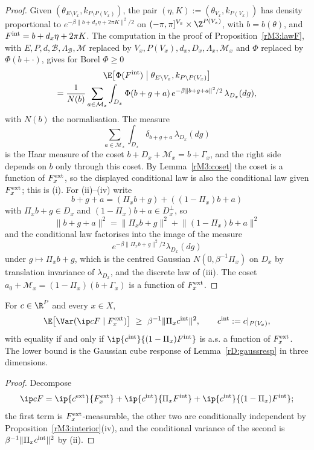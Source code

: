 \begin{proof}
Given $(\theta_{E\setminus V_x},k_{P\setminus P(V_x)})$, the pair
$(\eta,K):=(\theta_{V_x},k_{P(V_x)})$ has density proportional to
$e^{-\beta\lVert b+d_x\eta+2\pi K\rVert^2/2}$ on $(-\pi,\pi]^{V_x}\times
\Z^{P(V_x)}$, with $b=b(\theta)$, and $F^{\rm int}=b+d_x\eta+2\pi K$. The
computation in the proof of Proposition~\ref{rM3:lawF}, with $E,P,d,
\mathcal B,\Lambda_{\mathcal B},\mathcal M$ replaced by $V_x,P(V_x),d_x,
D_x,\Lambda_x,\mathcal M_x$ and $\Phi$ replaced by $\Phi(b+\cdot)$, gives
for Borel $\Phi\ge0$
\begin{multline*}
\E\bigl[\Phi(F^{\rm int})\bigm|\theta_{E\setminus V_x},k_{P\setminus P(V_x)}
\bigr]\\
=\frac1{N(b)}\sum_{a\in\mathcal M_x}\int_{D_x}\Phi(b+g+a)\,
e^{-\beta\lVert b+g+a\rVert^2/2}\,\lambda_{D_x}(dg),
\end{multline*}
with $N(b)$ the normalisation. The measure
\[
\sum_{a\in\mathcal M_x}\int_{D_x}\delta_{b+g+a}\,\lambda_{D_x}(dg)
\]
is the Haar measure of the coset
$b+D_x+\mathcal M_x=b+\Gamma_x$, and the right side depends on $b$ only
through this coset. By Lemma~\ref{rM3:coset} the coset is a function of
$F^{\rm ext}_x$, so the displayed conditional law is also the conditional
law given $F^{\rm ext}_x$; this is (i). For (ii)--(iv) write
\[
b+g+a=(\Pi_xb+g)+((1-\Pi_x)b+a)
\]
with $\Pi_xb+g\in D_x$ and $(1-\Pi_x)b+a\in
D_x^\perp$, so
\[
\lVert b+g+a\rVert^2=\lVert\Pi_xb+g\rVert^2+\lVert(1-\Pi_x)b+a\rVert^2
\]
and the conditional law factorises into the image of the measure
\[
e^{-\beta\lVert\Pi_xb+g\rVert^2/2}\lambda_{D_x}(dg)
\]
under $g\mapsto\Pi_xb+g$, which is the centred Gaussian $N(0,\beta^{-1}\Pi_x)$ on $D_x$ by translation
invariance of $\lambda_{D_x}$, and the discrete law of (iii). The coset
$a_0+\mathcal M_x=(1-\Pi_x)(b+\Gamma_x)$ is a function of $F^{\rm ext}_x$.
\end{proof}

\begin{corollary}\label{rM3:photon}
For $c\in\R^P$ and every $x\in X$,
\[
\E\bigl[\Var(\ip cF\mid F^{\rm ext}_x)\bigr]\ \ge\ \beta^{-1}\lVert\Pi_x
c^{\rm int}\rVert^2,\qquad c^{\rm int}:=c|_{P(V_x)},
\]
with equality if and only if $\ip{c^{\rm int}}{(1-\Pi_x)F^{\rm int}}$ is
a.s. a function of $F^{\rm ext}_x$. The lower bound is the Gaussian cube
response of Lemma~\ref{rD:gaussresp} in three dimensions.
\end{corollary}

\begin{proof}
Decompose
\[
\ip cF=\ip{c^{\rm ext}}{F^{\rm ext}_x}+\ip{c^{\rm int}}{\Pi_xF^{\rm int}}
+\ip{c^{\rm int}}{(1-\Pi_x)F^{\rm int}};
\]
the first term is
$F^{\rm ext}_x$-measurable, the other two are conditionally independent by
Proposition~\ref{rM3:interior}(iv), and the conditional variance of the
second is $\beta^{-1}\lVert\Pi_xc^{\rm int}\rVert^2$ by (ii).
\end{proof}

